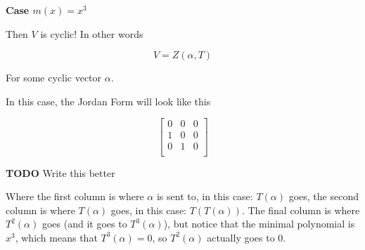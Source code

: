 \documentclass[12pt]{article}
\newcommand{\TODO}{\color{red}\textbf{TODO}\color{black}}
\begin{document}
{    {\bf Case $m(x) = x^3$}

    Then $V$ is cyclic! In other words

    \[
      V = Z(\alpha, T)
    \]

    For some cyclic vector $\alpha$.


    In this case, the Jordan Form will look like this

    \[
      \begin{bmatrix}
        0 & 0 & 0 \\
        1 & 0 & 0 \\
        0 & 1 & 0 \\
      \end{bmatrix}
    \]

    \TODO{} Write this better

    Where the first column is where $\alpha$ is sent to, in this case:
    $T(\alpha)$ goes, the second column is where $T(\alpha)$ goes, in this case:
    $T(T(\alpha))$. The final column is where $T^2(\alpha)$ goes (and it goes to
    $T^3(\alpha)$), but notice that the minimal polynomial is $x^3$, which means
    that $T^3(\alpha) = 0$, so $T^2(\alpha)$ actually goes to $0$.
  }
\end{document}
